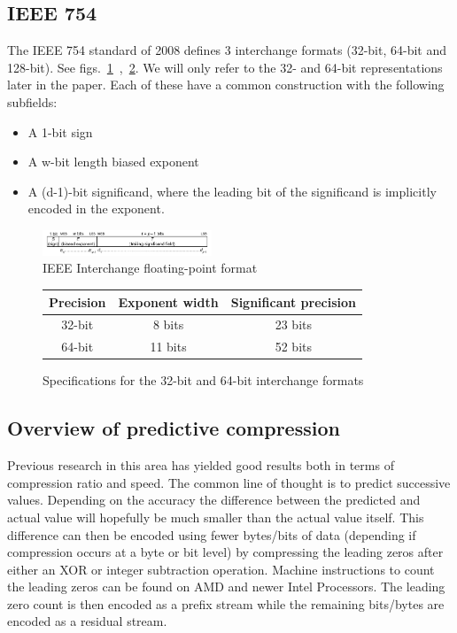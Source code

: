 \documentclass{acm_proc_article-sp}
\begin{document}
\subsection{IEEE 754}
The IEEE 754 standard of 2008 defines 3 interchange formats (32-bit, 64-bit and 128-bit). See figs.~\ref{IEEE_FLOAT}~,~\ref{IEEE_FLOAT_TAB}. We will only refer to the 32- and 64-bit representations later in the paper.  
Each of these have a common construction with the following subfields:
\begin{itemize}
 \item A 1-bit sign
 \item A w-bit length biased exponent
 \item A (d-1)-bit significand, where the leading bit of the significand is implicitly encoded in the exponent.
\end{itemize}
\begin{figure}[h!]
 \centering
 \includegraphics[width=0.45\textwidth]{IEEEinterchangeFormat.png}
 \caption{IEEE Interchange floating-point format \cite{4610935}}
 \label{IEEE_FLOAT}
\end{figure}
\begin{figure}[h!]
\centering
\begin{tabular}{|c|c|c|}
 \hline
 Precision & Exponent width & Significant precision \\
 \hline
 32-bit & 8 bits & 23 bits \\
 \hline
 64-bit & 11 bits & 52 bits \\
 \hline
\end{tabular}
\caption{Specifications for the 32-bit and 64-bit interchange formats}
 \label{IEEE_FLOAT_TAB}
\end{figure}
\subsection{Overview of predictive compression}
Previous research \cite{1607248,4589203,engelson2000lossless,lindstrom2006fast,O'Neil:2011:FDC:1964179.1964189,4976448} in this area has yielded good results both in terms of compression ratio and speed. 
The common line of thought is to predict successive values. Depending on the accuracy the difference between the predicted and actual value will hopefully be much smaller than the actual value itself. 
This difference can then be encoded using fewer bytes/bits of data (depending if compression occurs at a byte or bit level) by compressing the leading zeros after either an XOR or integer subtraction 
operation. Machine instructions to count the leading zeros can be found on AMD and newer Intel Processors. The leading zero count is then encoded as a prefix stream while the remaining bits/bytes 
are encoded as a residual stream.
\end{document}
